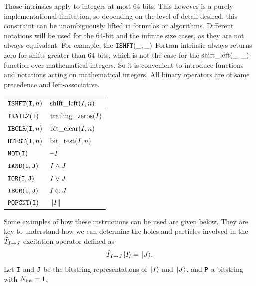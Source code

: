 \documentclass[./thesis.tex]{subfiles}
\begin{document}
      
Those intrinsics apply to integers at most 64-bits. This however is a purely implementational limitation, so depending on the level of detail desired, this constraint can be unambiguously lifted in formulas or algorithms. Different notations will be used for the 64-bit and the infinite size cases, as they are not always equivalent.
For example, the $\text{\texttt{ISHFT}}(\_,\_)$ Fortran intrinsic always returns zero for shifts greater than 64 bits, which is not the case for the $\text{shift\_left}(\_,\_)$ function over mathematical integers.
So it is convenient to introduce functions and notations acting on mathematical integers. All binary operators are of same precedence and left-associative.

\begin{table}[H]
	\begin{tabularx}{\textwidth}{X|X}
		\hline
		
		\hline
		\rule{0pt}{3ex}
		$\text{\texttt{ISHFT}}({\texttt{I}},n)$ & $\text{shift\_left}(I,n)$  \\ 
		
		\hline
		\rule{0pt}{3ex}
		$\text{\texttt{TRAILZ}}({\texttt{I}})$ & $\text{trailing\_zeros}(I)$  \\ 
		
		\hline
		\rule{0pt}{3ex}
		$\text{\texttt{IBCLR}}({\texttt{I}},n)$ & $\text{bit\_clear}(I,n)$  \\ 
		
		\hline
		\rule{0pt}{3ex}
		$\text{\texttt{BTEST}}({\texttt{I}},n)$ & $\text{bit\_test}(I,n)$  \\ 
		
		\hline
		\rule{0pt}{3ex}
		$\text{\texttt{NOT}}({\texttt{I}})$ & $\neg I $  \\ 
		
		\hline
		\rule{0pt}{3ex}
		$\text{\texttt{IAND}}({\texttt{I}},{{\texttt{J}}})$ & $I \wedge J$ \\
		
		\hline
		\rule{0pt}{3ex}
		$\text{\texttt{IOR}}({\texttt{I}},{{\texttt{J}}})$ & $I \vee J$ \\
		
		\hline
		\rule{0pt}{3ex}
		$\text{\texttt{IEOR}}({\texttt{I}},{{\texttt{J}}})$ & $I \oplus J$ \\
		
		\hline
		\rule{0pt}{3ex}
		$\text{\texttt{POPCNT}}({\texttt{I}})$ & $\norm{I}$ \\
		\hline
	\end{tabularx}
\end{table}


Some examples of how these instructions can be used are given below. They are key to understand how we can determine the holes and particles involved in the ${\hat{T}_{I \rightarrow J}}$ excitation operator defined as
\begin{equation}
{\hat{T}_{I \rightarrow J}} {\ket*{I}} = {\ket*{J}}.
\end{equation}
Let ${\texttt{I}}$ and ${{\texttt{J}}}$ be the bitstring representations of ${\ket*{I}}$ and ${\ket*{J}}$, and ${\texttt{P}}$ a bitstring with ${N_\text{int}}=1$. 
\end{document}
